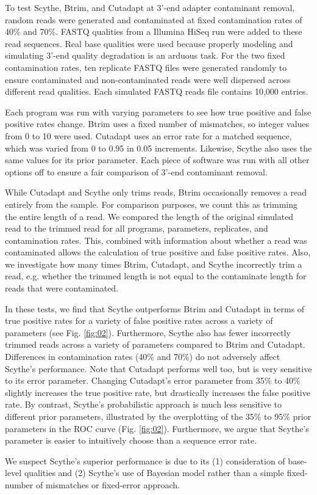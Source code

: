 \documentclass{bioinfo}
\begin{document}
\begin{methods}
To test Scythe, Btrim, and Cutadapt at 3'-end adapter contaminant
removal, random reads were generated and contaminated at fixed
contamination rates of 40\% and 70\%. FASTQ qualities from a Illumina
HiSeq run were added to these read sequences. Real base qualities were
used because properly modeling and simulating 3'-end quality
degradation is an arduous task. For the two fixed contamination rates,
ten replicate FASTQ files were generated randomly to ensure
contaminated and non-contaminated reads were well dispersed across
different read qualities. Each simulated FASTQ reads file contains
10,000 entries.

Each program was run with varying parameters to see how true positive
and false positive rates change. Btrim uses a fixed number of
mismatches, so integer values from 0 to 10 were used. Cutadapt uses an
error rate for a matched sequence, which was varied from 0 to 0.95 in
0.05 increments. Likewise, Scythe also uses the same values for its
prior parameter. Each piece of software was run with all other options
off to ensure a fair comparison of 3'-end contaminant removal.

While Cutadapt and Scythe only trims reads, Btrim occasionally removes
a read entirely from the sample. For comparison purposes, we count
this as trimming the entire length of a read. We compared the length
of the original simulated read to the trimmed read for all programs,
parameters, replicates, and contamination rates. This, combined with
information about whether a read was contaminated allows the
calculation of true positive and false positive rates. Also, we
investigate how many times Btrim, Cutadapt, and Scythe incorrectly
trim a read, e.g. whether the trimmed length is not equal to the
contaminate length for reads that were contaminated.

In these tests, we find that Scythe outperforms Btrim and Cutadapt in
terms of true positive rates for a variety of false positive rates
across a variety of parameters (see Fig. \ref{fig:02}). Furthermore,
Scythe also has fewer incorrectly trimmed reads across a variety of
parameters compared to Btrim and Cutadapt. Differences in
contamination rates (40\% and 70\%) do not adversely affect Scythe's
performance. Note that Cutadapt performs well too, but is very
sensitive to its error parameter. Changing Cutadapt's error parameter
from 35\% to 40\% slightly increases the true positive rate, but
drastically increases the false positive rate. By contrast, Scythe's
probabilistic approach is much less sensitive to different prior
parameters, illustrated by the overplotting of the 35\% to 95\% prior
parameters in the ROC curve (Fig. \ref{fig:02}). Furthermore, we argue
that Scythe's parameter is easier to intuitively choose than a
sequence error rate.

We suspect Scythe's superior performance is due to its (1)
consideration of base-level qualities and (2) Scythe's use of Bayesian
model rather than a simple fixed-number of mismatches or fixed-error
approach.

\end{methods}
\end{document}
